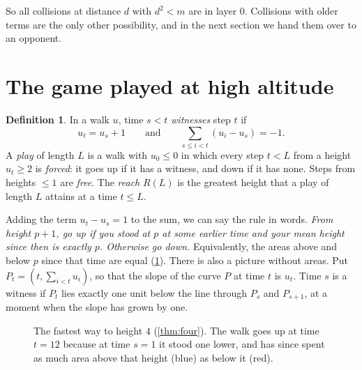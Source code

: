 \documentclass[11pt]{amsart}
\theoremstyle{definition}
\newtheorem{definition}[theorem]{Definition}
\begin{document}
So all collisions at distance $d$ with $d^2<m$ are in layer $0$. Collisions with older terms are the only other possibility,
and in the next section we hand them over to an opponent.

\section{The game played at high altitude}\label{sec:game}

\begin{definition}\label{def:game}
In a walk $u$, time $s<t$ \emph{witnesses} step $t$ if
\[
  u_t=u_s+1\qquad\text{and}\qquad\sum_{s\le i<t}(u_i-u_s)=-1 .
\]
A \emph{play} of length $L$ is a walk with $u_0\le0$ in which every step $t<L$ from a height $u_t\ge2$ is \emph{forced}:
it goes up if it has a witness, and down if it has none. Steps from heights $\le1$ are \emph{free}. The \emph{reach} $R(L)$ is the
greatest height that a play of length $L$ attains at a time $t\le L$.
\end{definition}

Adding the term $u_t-u_s=1$ to the sum, we can say the rule in words. \emph{From height $p+1$, go up if you stood at $p$ at some earlier time and your mean height
since then is exactly $p$. Otherwise go down.} Equivalently, the areas above and below $p$ since that time are equal (\cref{fig:play}). There is also a
picture without areas. Put $P_t=(t,\sum_{i<t}u_i)$, so that the slope of the curve $P$ at time $t$ is $u_t$. Time $s$ is a witness if $P_t$ lies exactly one unit below the line through $P_s$ and
$P_{s+1}$, at a moment when the slope has grown by one.

\begin{figure}[H]
\centering
{}
\caption{The fastest way to height $4$ (\cref{thm:four}). The walk goes up at time $t=12$ because at time $s=1$ it stood
one lower, and has since spent as much area above that height (blue) as below it (red).}
\label{fig:play}
\end{figure}
\end{document}
